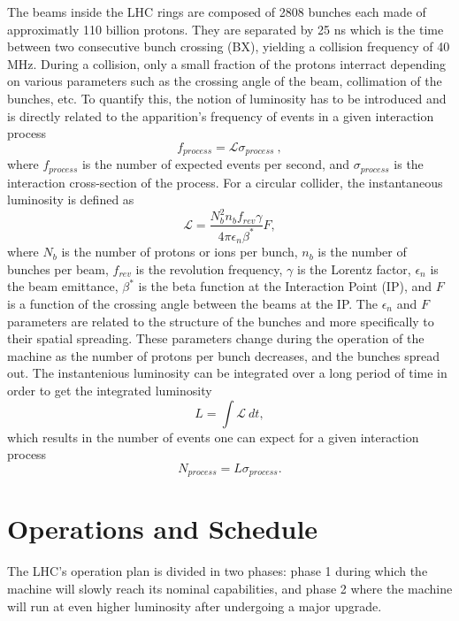   	The beams inside the LHC rings are composed of 2808 bunches each made of approximatly 110 billion protons. They are separated by 25 ns which is the time between two consecutive bunch crossing (BX), yielding a collision frequency of 40 MHz. During a collision, only a small fraction of the protons interract depending on various parameters such as the crossing angle of the beam, collimation of the bunches, etc. To quantify this, the notion of luminosity has to be introduced and is directly related to the apparition's frequency of events in a given interaction process
  	\begin{equation}
  		f_{process} = \mathcal{L} \sigma_{process} \ ,
  	\end{equation}
  	where $ f_{process} $ is the number of expected events per second, and $ \sigma_{process} $ is the interaction cross-section of the process. For a circular collider, the instantaneous luminosity is defined as
  	\begin{equation}
  		\mathcal{L} = \frac{N^2_b n_b f_{rev} \gamma}{4 \pi \epsilon_n \beta^*} F ,
  	\end{equation}
  	where $ N_b $ is the number of protons or ions per bunch, $ n_b $ is the number of bunches per beam, $ f_{rev} $ is the revolution frequency, $ \gamma $ is the Lorentz factor, $ \epsilon_n $ is the beam emittance, $ \beta^* $ is the beta function at the Interaction Point (IP), and $ F $ is a function of the crossing angle between the beams at the IP. The $ \epsilon_n $ and $ F $ parameters are related to the structure of the bunches and more specifically to their spatial spreading. These parameters change during the operation of the machine as the number of protons per bunch decreases, and the bunches spread out. The instantenious luminosity can be integrated over a long period of time in order to get the integrated luminosity
  	\begin{equation}
  		L = \int \mathcal{L} \ dt ,
  	\end{equation}
  	which results in the number of events one can expect for a given interaction process
  	\begin{equation}
  		N_{process} = L \sigma_{process} .
  	\end{equation}

	\section{Operations and Schedule}

		The LHC's operation plan \Cite{CMS_Upgrades} is divided in two phases: phase 1 during which the machine will slowly reach its nominal capabilities, and phase 2 where the machine will run at even higher luminosity after undergoing a major upgrade. \\

